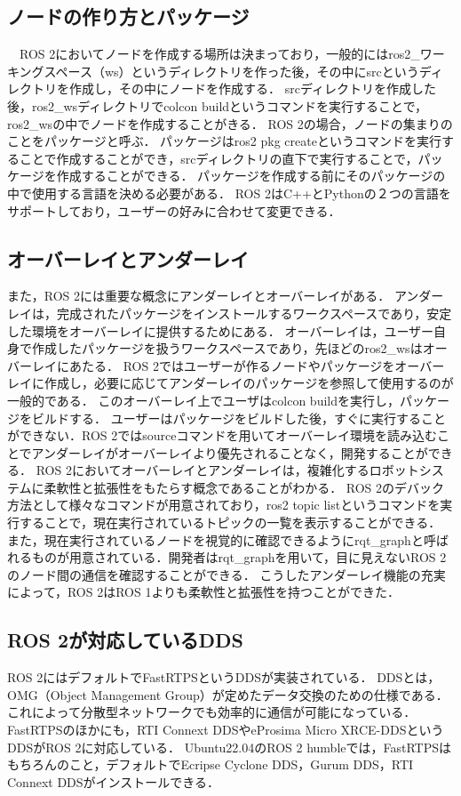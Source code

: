 \subsection{ノードの作り方とパッケージ}
　ROS 2においてノードを作成する場所は決まっており，一般的にはros2\_ワーキングスペース（ws）というディレクトリを作った後，その中にsrcというディレクトリを作成し，その中にノードを作成する．
srcディレクトリを作成した後，ros2\_wsディレクトリでcolcon buildというコマンドを実行することで，ros2\_wsの中でノードを作成することがきる．
ROS 2の場合，ノードの集まりのことをパッケージと呼ぶ．
パッケージはros2 pkg createというコマンドを実行することで作成することができ，srcディレクトリの直下で実行することで，パッケージを作成することができる．
パッケージを作成する前にそのパッケージの中で使用する言語を決める必要がある．
ROS 2はC++とPythonの２つの言語をサポートしており，ユーザーの好みに合わせて変更できる．
\subsection{オーバーレイとアンダーレイ}
また，ROS 2には重要な概念にアンダーレイとオーバーレイがある．
アンダーレイは，完成されたパッケージをインストールするワークスペースであり，安定した環境をオーバーレイに提供するためにある．
オーバーレイは，ユーザー自身で作成したパッケージを扱うワークスペースであり，先ほどのros2\_wsはオーバーレイにあたる．
ROS 2ではユーザーが作るノードやパッケージをオーバーレイに作成し，必要に応じてアンダーレイのパッケージを参照して使用するのが一般的である．
このオーバーレイ上でユーザはcolcon buildを実行し，パッケージをビルドする．
ユーザーはパッケージをビルドした後，すぐに実行することができない．ROS 2ではsourceコマンドを用いてオーバーレイ環境を読み込むことでアンダーレイがオーバーレイより優先されることなく，開発することができる．
ROS 2においてオーバーレイとアンダーレイは，複雑化するロボットシステムに柔軟性と拡張性をもたらす概念であることがわかる．
ROS 2のデバック方法として様々なコマンドが用意されており，ros2 topic listというコマンドを実行することで，現在実行されているトピックの一覧を表示することができる．
また，現在実行されているノードを視覚的に確認できるようにrqt\_graphと呼ばれるものが用意されている．開発者はrqt\_graphを用いて，目に見えないROS 2のノード間の通信を確認することができる．
こうしたアンダーレイ機能の充実によって，ROS 2はROS 1よりも柔軟性と拡張性を持つことができた．
\subsection{ROS 2が対応しているDDS}
ROS 2にはデフォルトでFastRTPSというDDSが実装されている．
DDSとは，OMG（Object Management Group）が定めたデータ交換のための仕様である．これによって分散型ネットワークでも効率的に通信が可能になっている．
FastRTPSのほかにも，RTI Connext DDSやeProsima Micro XRCE-DDSというDDSがROS 2に対応している．
Ubuntu22.04のROS 2 humbleでは，FastRTPSはもちろんのこと，デフォルトでEcripse Cyclone DDS，Gurum DDS，RTI Connext DDSがインストールできる．%
